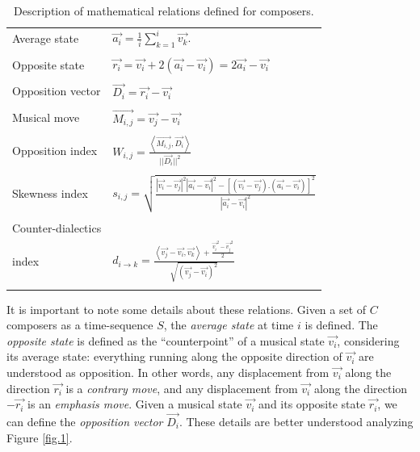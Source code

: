 \documentclass[
 aip,
 jmp,
 amsmath,amssymb,
 reprint,
]{revtex4-1}
\begin{document}
\begin{table}
\caption{\label{tab:tableRelations}Description of mathematical relations defined for composers.}

\begin{ruledtabular}
\begin{tabular}{ll}

\\ Average state & $\vec{a_i} = \frac{1}{i}\sum_{k=1}^i\vec{v_k}.$ \\ \\

Opposite state & $\vec{r_i} = \vec{v_i} + 2(\vec{a_i} - \vec{v_i})  = 2 \vec{a_i} - \vec{v_i}$  \\ \\

Opposition vector & $\vec{D_i}=\vec{r_i} - \vec{v_i}$ \\ \\

Musical move & $\vec{M_{i,j}} = \vec{v_j} - \vec{v_i}$ \\ \\

Opposition index & $W_{i,j} = \frac{\left< \vec{M_{i,j}}, \vec{D_i}\right>}{||\vec{D_i}||^2}$ \\ \\

Skewness index & $s_{i,j} = \sqrt{\frac{|\vec{v_i}-\vec{v_j}|^2|\vec{a_i}-\vec{v_i}|^2 - [(\vec{v_i}-\vec{v_j}) . (\vec{a_i}-\vec{v_i})]^2}{|\vec{a_i}-\vec{v_i}|^2}}$ \\ \\

Counter-dialectics \\ index & $d_{i \rightarrow k} = \frac{\left< \vec{v_j} - \vec{v_i}, \vec{v_k} \right> + \frac{\vec{v_i}^2 - \vec{v_j}^2}{2}}{\sqrt{(\vec{v_j}-\vec{v_i})^2}}$ \\ \\ 


\end{tabular}
\end{ruledtabular}
\end{table}

It is important to note some details about these relations. Given a set of $C$ composers as a time-sequence $S$, the \emph{average state} at time $i$ is defined. The \emph{opposite state} is defined as the ``counterpoint'' of a musical state $\vec{v_i}$, considering its average state: everything running along the opposite direction of $\vec{v_i}$ are understood as opposition. In other words, any displacement from $\vec{v_i}$ along the direction $\vec{r_i}$ is a \emph{contrary move}, and any displacement from $\vec{v_i}$ along the direction $-\vec{r_i}$ is an \emph{emphasis move}. Given a musical state $\vec{v_i}$ and its opposite state $\vec{r_i}$, we can define the \emph{opposition vector} $\vec{D_i}$. These details are better understood analyzing Figure \ref{fig.1}.
\end{document}
